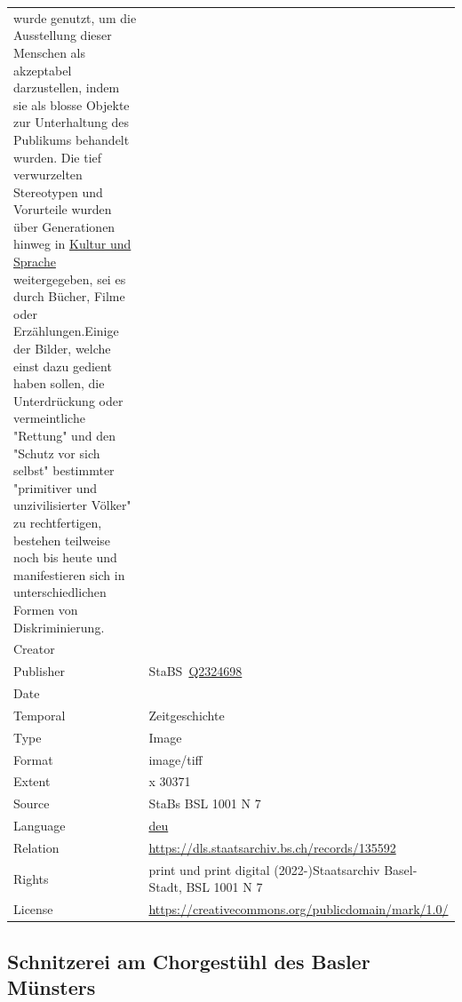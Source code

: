 \documentclass[
  letterpaper,
  DIV=11,
  numbers=noendperiod]{scrartcl}
\begin{document}
\begin{longtable}[]{@{}
  >{\raggedright\arraybackslash}p{}
  >{\raggedright\arraybackslash}p{}@{}}
wurde genutzt, um die Ausstellung dieser Menschen als akzeptabel
darzustellen, indem sie als blosse Objekte zur Unterhaltung des
Publikums behandelt wurden. Die tief verwurzelten Stereotypen und
Vorurteile wurden über Generationen hinweg in
\href{https://mirsindvoda.ch/voelkerschauen-in-der-schweiz/}{Kultur und
Sprache} weitergegeben, sei es durch Bücher, Filme oder
Erzählungen.Einige der Bilder, welche einst dazu gedient haben sollen,
die Unterdrückung oder vermeintliche "Rettung" und den "Schutz vor sich
selbst" bestimmter "primitiver und unzivilisierter Völker" zu
rechtfertigen, bestehen teilweise noch bis heute und manifestieren sich
in unterschiedlichen Formen von Diskriminierung. \\
Creator & \\
Publisher &
StaBS~\href{https://www.wikidata.org/wiki/Q2324698}{Q2324698} \\
Date & 1926 \\
Temporal & Zeitgeschichte \\
Type & Image \\
Format & image/tiff \\
Extent & 23376 x 30371 \\
Source & StaBs BSL 1001 N 7 \\
Language &
\href{https://www.loc.gov/standards/iso639-2/php/langcodes_name.php?code_ID=160}{deu} \\
Relation & \url{https://dls.staatsarchiv.bs.ch/records/135592} \\
Rights & print und print digital (2022-)Staatsarchiv Basel-Stadt, BSL
1001 N 7 \\
License & \url{https://creativecommons.org/publicdomain/mark/1.0/} \\
\end{longtable}

\subsection{Schnitzerei am Chorgestühl des Basler
Münsters}\label{schnitzerei-am-chorgestuxfchl-des-basler-muxfcnsters}
\end{document}
